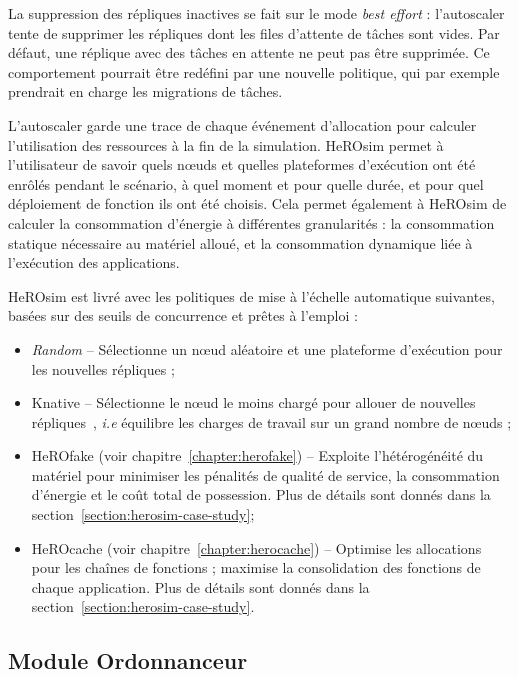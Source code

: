 La suppression des répliques inactives se fait sur le mode \textit{best effort} : l'autoscaler tente de supprimer les répliques dont les files d'attente de tâches sont vides. Par défaut, une réplique avec des tâches en attente ne peut pas être supprimée. Ce comportement pourrait être redéfini par une nouvelle politique, qui par exemple prendrait en charge les migrations de tâches.

L'autoscaler garde une trace de chaque événement d'allocation pour calculer l'utilisation des ressources à la fin de la simulation. HeROsim permet à l'utilisateur de savoir quels nœuds et quelles plateformes d'exécution ont été enrôlés pendant le scénario, à quel moment et pour quelle durée, et pour quel déploiement de fonction ils ont été choisis. Cela permet également à HeROsim de calculer la consommation d'énergie à différentes granularités : la consommation statique nécessaire au matériel alloué, et la consommation dynamique liée à l'exécution des applications.


HeROsim est livré avec les politiques de mise à l'échelle automatique suivantes, basées sur des seuils de concurrence et prêtes à l'emploi :

\begin{itemize}
    \item \textit{Random} -- Sélectionne un nœud aléatoire et une plateforme d'exécution pour les nouvelles répliques ;
    \item Knative -- Sélectionne le nœud le moins chargé pour allouer de nouvelles répliques~\cite{sureshENSUREEfficientScheduling2020}, \textit{i.e} équilibre les charges de travail sur un grand nombre de nœuds ;
    \item HeROfake (voir chapitre~\ref{chapter:herofake}) -- Exploite l'hétérogénéité du matériel pour minimiser les pénalités de qualité de service, la consommation d'énergie et le coût total de possession. Plus de détails sont donnés dans la section~\ref{section:herosim-case-study};
    \item HeROcache (voir chapitre~\ref{chapter:herocache}) -- Optimise les allocations pour les chaînes de fonctions ; maximise la consolidation des fonctions de chaque application. Plus de détails sont donnés dans la section~\ref{section:herosim-case-study}.
\end{itemize}

\subsection{Module Ordonnanceur}

